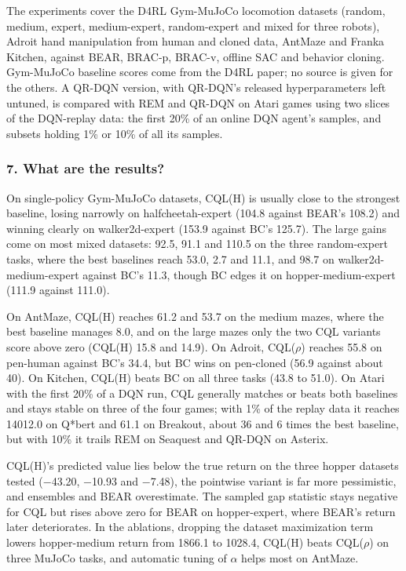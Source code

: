 \documentclass[11pt]{article}
\newcommand{\question}[1]{\subsubsection*{#1}}
\begin{document}
The experiments cover the D4RL Gym-MuJoCo locomotion datasets (random, medium, expert, medium-expert, random-expert and mixed for three robots), Adroit hand manipulation from human and cloned data, AntMaze and Franka Kitchen, against BEAR, BRAC-p, BRAC-v, offline SAC and behavior cloning. Gym-MuJoCo baseline scores come from the D4RL paper; no source is given for the others. A QR-DQN version, with QR-DQN's released hyperparameters left untuned, is compared with REM and QR-DQN on Atari games using two slices of the DQN-replay data: the first 20\% of an online DQN agent's samples, and subsets holding 1\% or 10\% of all its samples.

\question{7. What are the results?}

On single-policy Gym-MuJoCo datasets, CQL(H) is usually close to the strongest baseline, losing narrowly on halfcheetah-expert (104.8 against BEAR's 108.2) and winning clearly on walker2d-expert (153.9 against BC's 125.7). The large gains come on most mixed datasets: 92.5, 91.1 and 110.5 on the three random-expert tasks, where the best baselines reach 53.0, 2.7 and 11.1, and 98.7 on walker2d-medium-expert against BC's 11.3, though BC edges it on hopper-medium-expert (111.9 against 111.0).

On AntMaze, CQL(H) reaches 61.2 and 53.7 on the medium mazes, where the best baseline manages 8.0, and on the large mazes only the two CQL variants score above zero (CQL(H) 15.8 and 14.9). On Adroit, CQL(\ensuremath{\rho}) reaches 55.8 on pen-human against BC's 34.4, but BC wins on pen-cloned (56.9 against about 40). On Kitchen, CQL(H) beats BC on all three tasks (43.8 to 51.0). On Atari with the first 20\% of a DQN run, CQL generally matches or beats both baselines and stays stable on three of the four games; with 1\% of the replay data it reaches 14012.0 on Q*bert and 61.1 on Breakout, about 36 and 6 times the best baseline, but with 10\% it trails REM on Seaquest and QR-DQN on Asterix.

CQL(H)'s predicted value lies below the true return on the three hopper datasets tested (\ensuremath{-}43.20, \ensuremath{-}10.93 and \ensuremath{-}7.48), the pointwise variant is far more pessimistic, and ensembles and BEAR overestimate. The sampled gap statistic stays negative for CQL but rises above zero for BEAR on hopper-expert, where BEAR's return later deteriorates. In the ablations, dropping the dataset maximization term lowers hopper-medium return from 1866.1 to 1028.4, CQL(H) beats CQL(\ensuremath{\rho}) on three MuJoCo tasks, and automatic tuning of \ensuremath{\alpha} helps most on AntMaze.
\end{document}
